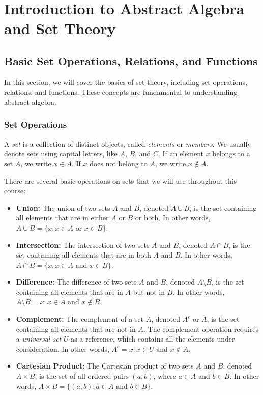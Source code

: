 \documentclass{report}
\begin{document}
\chapter{Introduction to Abstract Algebra and Set Theory}

\section{Basic Set Operations, Relations, and Functions}

In this section, we will cover the basics of set theory, including set operations, relations, and functions. These concepts are fundamental to understanding abstract algebra.

\subsection{Set Operations}

A \textit{set} is a collection of distinct objects, called \textit{elements} or \textit{members}. We usually denote sets using capital letters, like $A$, $B$, and $C$. If an element $x$ belongs to a set $A$, we write $x \in A$. If $x$ does not belong to $A$, we write $x \notin A$.

There are several basic operations on sets that we will use throughout this course:

\begin{itemize} 

\item \textbf{Union:} The union of two sets $A$ and $B$, denoted $A \cup B$, is the set containing all elements that are in either $A$ or $B$ or both. In other words, $A \cup B = \{x:x \in A \text{ or } x \in B\}$. 

    \item \textbf{Intersection:} The intersection of two sets $A$ and $B$, denoted $A \cap B$, is the set containing all elements that are in both $A$ and $B$. In other words, $A \cap B = \{x:x \in A \text{ and } x \in B\}$.

    \item \textbf{Difference:} The difference of two sets $A$ and $B$, denoted $A \setminus B$, is the set containing all elements that are in $A$ but not in $B$. In other words, $A \setminus B = {x:x \in A \text{ and } x \notin B}$. 

    \item \textbf{Complement:} The complement of a set $A$, denoted $A^c$ or $\overline{A}$, is the set containing all elements that are not in $A$. The complement operation requires a \textit{universal set} $U$ as a reference, which contains all the elements under consideration. In other words, $A^c ={x:x \in U \text{ and } x \notin A}$.

    \item \textbf{Cartesian Product:} The Cartesian product of two sets $A$ and $B$, denoted $A \times B$, is the set of all ordered pairs $(a, b)$, where $a \in A$ and $b \in B$. In other words, $A \times B = \{(a,b):a \in A \text{ and } b \in B\}$. 

\end{itemize}
\end{document}
